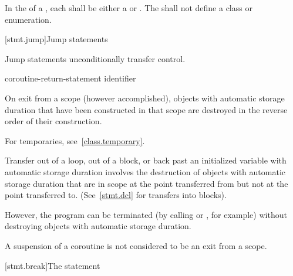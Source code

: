 \pnum
In the  of a ,
each  shall be either a 
or . The  shall not define a
class or enumeration.%

[stmt.jump]{Jump statements}%

\pnum
Jump statements unconditionally transfer control.
%

%
%
%
%
%
%
\begin{bnf}
\br
     \terminal{;}\br
     \terminal{;}\br
      \terminal{;}\br
    coroutine-return-statement\br
     identifier \terminal{;}
\end{bnf}

\pnum
{}%
%
On exit from a scope (however accomplished), objects with automatic storage
duration that have been constructed in that scope are destroyed
in the reverse order of their construction.
\begin{note}
For temporaries,
see~\ref{class.temporary}.
\end{note}
Transfer out of a loop, out of a block, or back
past
an initialized variable with automatic storage duration involves the
destruction of objects with automatic storage duration that are in
scope at the point transferred from but not at the point transferred to.
(See~\ref{stmt.dcl} for transfers into blocks).
\begin{note}
However, the program can be terminated (by calling
%
%
 or
%
%
, for example) without
destroying objects with automatic storage duration.
\end{note}
\begin{note}
A suspension of a coroutine is not considered to be an exit from a scope.
\end{note}

[stmt.break]{The  statement}%


